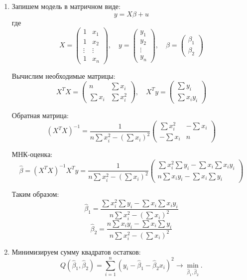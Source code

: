 \documentclass[12pt]{article}
\newcommand{\hb}{\hat{\beta}}
\begin{document}
\begin{sol}
\begin{enumerate}
\item Запишем модель в матричном виде:
\[ y = X\beta + u \]
где
\[
X = \begin{pmatrix}
1 & x_1 \\
1 & x_2 \\
\vdots & \vdots \\
1 & x_n
\end{pmatrix}, \quad
y = \begin{pmatrix}
y_1 \\
y_2 \\
\vdots \\
y_n
\end{pmatrix}, \quad
\beta = \begin{pmatrix}
\beta_1 \\
\beta_2
\end{pmatrix}
\]

Вычислим необходимые матрицы:
\[
X^TX = \begin{pmatrix}
n & \sum x_i \\
\sum x_i & \sum x_i^2
\end{pmatrix}, \quad
X^Ty = \begin{pmatrix}
\sum y_i \\
\sum x_i y_i
\end{pmatrix}
\]

Обратная матрица:
\[
(X^TX)^{-1} = \frac{1}{n\sum x_i^2 - (\sum x_i)^2}
\begin{pmatrix}
\sum x_i^2 & -\sum x_i \\
-\sum x_i & n
\end{pmatrix}
\]

МНК-оценка:
\[
\hat{\beta} = (X^TX)^{-1}X^Ty = \frac{1}{n\sum x_i^2 - (\sum x_i)^2}
\begin{pmatrix}
\sum x_i^2 \sum y_i - \sum x_i \sum x_i y_i \\
n \sum x_i y_i - \sum x_i \sum y_i
\end{pmatrix}
\]

Таким образом:
\[
\hat{\beta}_1 = \frac{\sum x_i^2 \sum y_i - \sum x_i \sum x_i y_i}{n\sum x_i^2 - (\sum x_i)^2}
\]
\[
\hat{\beta}_2 = \frac{n \sum x_i y_i - \sum x_i \sum y_i}{n\sum x_i^2 - (\sum x_i)^2}
\]

\item Минимизируем сумму квадратов остатков:
\[
Q(\hat{\beta}_1, \hat{\beta}_2) = \sum_{i=1}^n (y_i - \hat{\beta}_1 - \hat{\beta}_2 x_i)^2 \to \underset{\hb_1, \hb_2}{\min}.
\]


\end{enumerate}
\end{sol}
\end{document}
